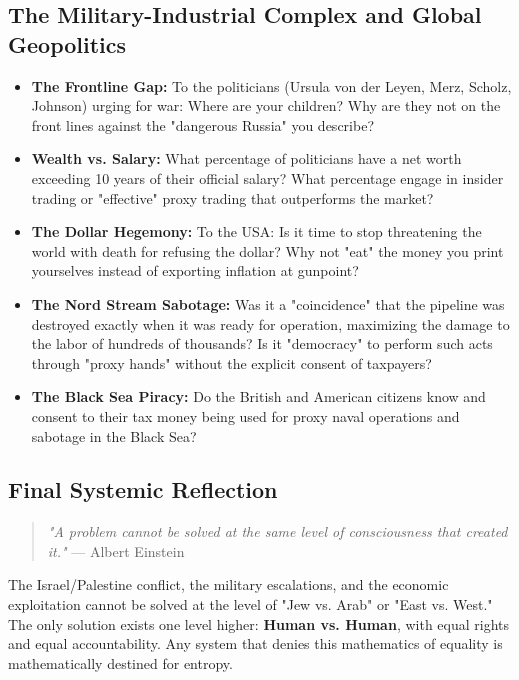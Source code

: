 \documentclass[11pt,a4paper]{article}
\theoremstyle{definition}
\theoremstyle{remark}
\begin{document}
\subsection{The Military-Industrial Complex and Global Geopolitics}

\begin{itemize}
    \item \textbf{The Frontline Gap:} To the politicians (Ursula von der Leyen, Merz, Scholz, Johnson) urging for war: Where are your children? Why are they not on the front lines against the "dangerous Russia" you describe?
    \item \textbf{Wealth vs. Salary:} What percentage of politicians have a net worth exceeding 10 years of their official salary? What percentage engage in insider trading or "effective" proxy trading that outperforms the market?
    \item \textbf{The Dollar Hegemony:} To the USA: Is it time to stop threatening the world with death for refusing the dollar? Why not "eat" the money you print yourselves instead of exporting inflation at gunpoint?
    \item \textbf{The Nord Stream Sabotage:} Was it a "coincidence" that the pipeline was destroyed exactly when it was ready for operation, maximizing the damage to the labor of hundreds of thousands? Is it "democracy" to perform such acts through "proxy hands" without the explicit consent of taxpayers?
    \item \textbf{The Black Sea Piracy:} Do the British and American citizens know and consent to their tax money being used for proxy naval operations and sabotage in the Black Sea?
\end{itemize}

\subsection{Final Systemic Reflection}

\begin{quote}
    \textit{"A problem cannot be solved at the same level of consciousness that created it."} --- Albert Einstein
\end{quote}

The Israel/Palestine conflict, the military escalations, and the economic exploitation cannot be solved at the level of "Jew vs. Arab" or "East vs. West." The only solution exists one level higher: \textbf{Human vs. Human}, with equal rights and equal accountability. Any system that denies this mathematics of equality is mathematically destined for entropy.
\end{document}
